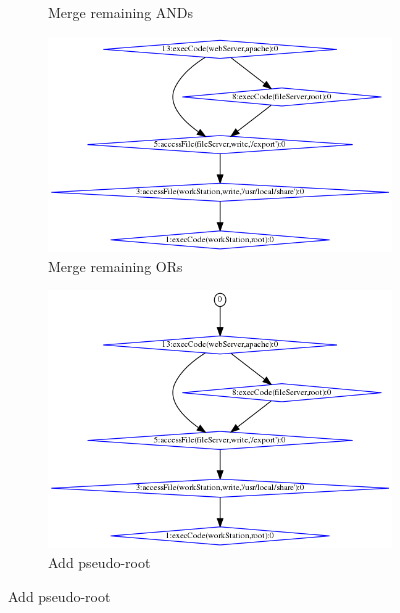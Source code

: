 \begin{figure}
\begin{subfigure}[t]{0.3\textwidth}
        \caption{Merge remaining ANDs} 
        \label{fig:tg_004}
    \end{subfigure}
    \hfill
    \vspace{.2cm}
    \centering
    \begin{subfigure}[t]{0.3\textwidth}
        \centering
        \includegraphics[width=\linewidth]{resource/img/ch_background/sdn_analytics/tmatrix_graphs/nameMe_005_coalesceORs.png} 
        \caption{Merge remaining ORs} 
        \label{fig:tg_005}
    \end{subfigure}
    \begin{subfigure}[t]{0.3\textwidth}
        \centering
        \includegraphics[width=\linewidth]{resource/img/ch_background/sdn_analytics/tmatrix_graphs/nameMe_006_addOrigin.png} 
        \caption{Add pseudo-root} 
        \label{fig:tg_006}
    \end{subfigure}

\end{figure}
